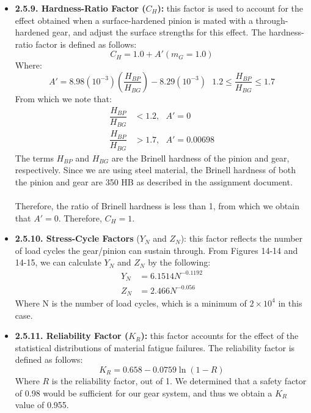 \documentclass[letterpaper,12pt]{article}
\begin{document}
\begin{itemize}
    \item \textbf{2.5.9. Hardness-Ratio Factor ($C_H$):} this factor is used to account for the effect obtained when a surface-hardened pinion is mated with a through-hardened gear, and adjust the surface strengths for this effect. The hardness-ratio factor is defined as follows:
    \begin{equation}
        C_H = 1.0 + A'(m_G = 1.0)
    \end{equation}
    Where:
    \begin{equation*}
        A' = 8.98(10^{-3})\left(\dfrac{H_{BP}}{H_{BG}}\right) - 8.29(10^{-3})\text{ }1.2 \leq \frac{H_{BP}}{H_{BG}} \leq 1.7
    \end{equation*}
    From which we note that:
    \begin{align*}
        \dfrac{H_{BP}}{H_{BG}} &< 1.2, \text{ $A' = 0$} \\
        \dfrac{H_{BP}}{H_{BG}} &> 1.7, \text{ $A' = 0.00698$}
    \end{align*}
    The terms $H_{BP}$ and $H_{BG}$ are the Brinell hardness of the pinion and gear, respectively. Since we are using steel material, the Brinell hardness of both the pinion and gear are 350 HB as described in the assignment document. \\\\
    Therefore, the ratio of Brinell hardness is less than 1, from which we obtain that $A' = 0$. Therefore, $C_H = 1$.
    
    \item \textbf{2.5.10. Stress-Cycle Factors} ($Y_N$ and $Z_N$): this factor reflects the number of load cycles the gear/pinion can sustain through. From Figures 14-14 and 14-15, we can calculate $Y_N$ and $Z_N$ by the following:
    \begin{align*}
        Y_N &= 6.1514 N^{-0.1192} \\
        Z_N &= 2.466 N^{-0.056}
    \end{align*}
    Where N is the number of load cycles, which is a minimum of $2 \times 10^4$ in this case.
    
    \item \textbf{2.5.11. Reliability Factor ($K_R$):} this factor accounts for the effect of the statistical distributions of material fatigue failures. The reliability factor is defined as follows:
    \begin{equation}
    K_R = 0.658-0.0759\ln{(1-R)}
    \end{equation}
    Where $R$ is the reliability factor, out of 1. We determined that a safety factor of 0.98 would be sufficient for our gear system, and thus we obtain a $K_R$ value of 0.955.
    

\end{itemize}
\end{document}

